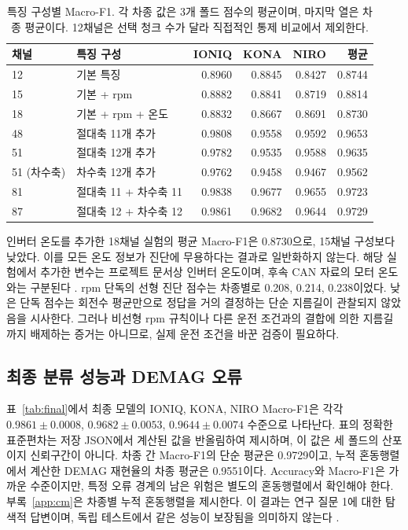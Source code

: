\documentclass[11pt,a4paper]{article}
\newcommand{\sourceproject}{\citep{project2026}}
\begin{document}
\begin{table}[htbp]
\centering
\caption{특징 구성별 Macro-F1. 각 차종 값은 3개 폴드 점수의 평균이며, 마지막 열은 차종 평균이다. 12채널은 선택 청크 수가 달라 직접적인 통제 비교에서 제외한다.}
\label{tab:ablation}
\begingroup\small\setlength{\tabcolsep}{5pt}
\begin{tabular}{llrrrr}
\toprule
채널 & 특징 구성 & IONIQ & KONA & NIRO & 평균 \\
\midrule
12 & 기본 특징 & 0.8960 & 0.8845 & 0.8427 & 0.8744 \\
15 & 기본 + rpm & 0.8882 & 0.8841 & 0.8719 & 0.8814 \\
18 & 기본 + rpm + 온도 & 0.8832 & 0.8667 & 0.8691 & 0.8730 \\
48 & 절대축 11개 추가 & 0.9808 & 0.9558 & 0.9592 & 0.9653 \\
51 & 절대축 12개 추가 & 0.9782 & 0.9535 & 0.9588 & 0.9635 \\
51 (차수축) & 차수축 12개 추가 & 0.9762 & 0.9458 & 0.9467 & 0.9562 \\
81 & 절대축 11 + 차수축 11 & 0.9838 & 0.9677 & 0.9655 & 0.9723 \\
87 & 절대축 12 + 차수축 12 & 0.9861 & 0.9682 & 0.9644 & 0.9729 \\
\bottomrule
\end{tabular}
\endgroup
\end{table}

인버터 온도를 추가한 18채널 실험의 평균 Macro-F1은 0.8730으로, 15채널 구성보다 낮았다.
이를 모든 온도 정보가 진단에 무용하다는 결과로 일반화하지 않는다.
해당 실험에서 추가한 변수는 프로젝트 문서상 인버터 온도이며, 후속 CAN 자료의 모터 온도와는 구분된다 \sourceproject.
rpm 단독의 선형 진단 점수는 차종별로 0.208, 0.214, 0.238이었다.
낮은 단독 점수는 회전수 평균만으로 정답을 거의 결정하는 단순 지름길이 관찰되지 않았음을 시사한다.
그러나 비선형 rpm 규칙이나 다른 운전 조건과의 결합에 의한 지름길까지 배제하는 증거는 아니므로, 실제 운전 조건을 바꾼 검증이 필요하다.

\subsection{최종 분류 성능과 DEMAG 오류}
표~\ref{tab:final}에서 최종 모델의 IONIQ, KONA, NIRO Macro-F1은 각각 $0.9861\pm0.0008$, $0.9682\pm0.0053$, $0.9644\pm0.0074$ 수준으로 나타난다.
표의 정확한 표준편차는 저장 JSON에서 계산된 값을 반올림하여 제시하며, 이 값은 세 폴드의 산포이지 신뢰구간이 아니다.
차종 간 Macro-F1의 단순 평균은 0.9729이고, 누적 혼동행렬에서 계산한 DEMAG 재현율의 차종 평균은 0.9551이다.
Accuracy와 Macro-F1은 가까운 수준이지만, 특정 오류 경계의 남은 위험은 별도의 혼동행렬에서 확인해야 한다.
부록~\ref{app:cm}은 차종별 누적 혼동행렬을 제시한다.
이 결과는 연구 질문 1에 대한 탐색적 답변이며, 독립 테스트에서 같은 성능이 보장됨을 의미하지 않는다 \sourceproject.
\end{document}
